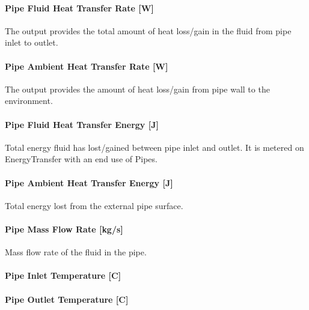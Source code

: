 \paragraph{Pipe Fluid Heat Transfer Rate {[}W{]}}\label{pipe-fluid-heat-transfer-rate-w}

The output provides the total amount of heat loss/gain in the fluid from pipe inlet to outlet.

\paragraph{Pipe Ambient Heat Transfer Rate {[}W{]}}\label{pipe-ambient-heat-transfer-rate-w}

The output provides the amount of heat loss/gain from pipe wall to the environment.

\paragraph{Pipe Fluid Heat Transfer Energy {[}J{]}}\label{pipe-fluid-heat-transfer-energy-j}

Total energy fluid has lost/gained between pipe inlet and outlet. It is metered on EnergyTransfer with an end use of Pipes.

\paragraph{Pipe Ambient Heat Transfer Energy {[}J{]}}\label{pipe-ambient-heat-transfer-energy-j}

Total energy lost from the external pipe surface.

\paragraph{Pipe Mass Flow Rate {[}kg/s{]}}\label{pipe-mass-flow-rate-kgs}

Mass flow rate of the fluid in the pipe.

\paragraph{Pipe Inlet Temperature {[}C{]}}\label{pipe-inlet-temperature-c}

\paragraph{Pipe Outlet Temperature {[}C{]}}\label{pipe-outlet-temperature-c}

